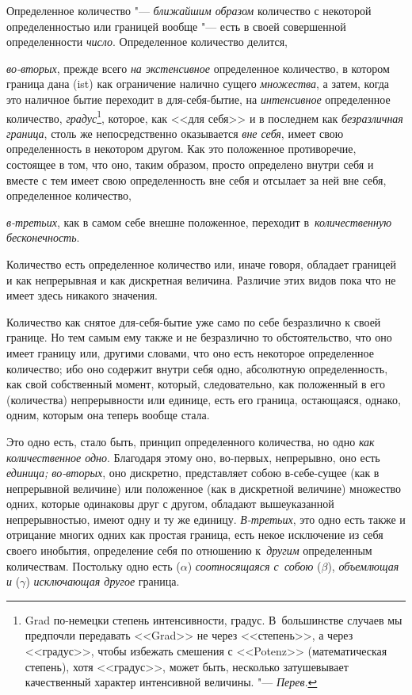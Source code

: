 Определенное количество "--- {\em ближайшим образом} количество с некоторой
определенностью или границей вообще "--- есть в своей совершенной
определенности {\em число}. Определенное количество делится,

{\em во-вторых}, прежде всего {\em на экстенсивное} определенное количество,
в котором граница дана (ist) как ограничение налично сущего {\em множества},
а затем, когда это наличное бытие переходит в для-себя-бытие, на
{\em интенсивное} определенное количество, {\em градус}\footnote{Grad
по-немецки степень интенсивности, градус. В~большинстве случаев мы предпочли
передавать <<Grad>> не через <<степень>>, а через <<градус>>, чтобы избежать
смешения с <<Potenz>> (математическая степень), хотя <<градус>>, может быть,
несколько затушевывает качественный характер интенсивной величины. "---
{\em Перев}.}, которое, как <<для себя>> и в последнем как {\em безразличная
граница}, столь же непосредственно оказывается {\em вне себя}, имеет свою
определенность в некотором другом. Как это положенное противоречие, состоящее
в том, что оно, таким образом, просто определено внутри себя и вместе с тем
имеет свою определенность вне себя и отсылает за ней вне себя, определенное
количество,

{\em в-третьих}, как в самом себе внешне положенное, переходит
в~{\em количественную бесконечность}.


Количество есть определенное количество или, иначе говоря, обладает границей
и как непрерывная и как дискретная величина. Различие этих видов пока что
не имеет здесь никакого значения.

Количество как снятое для-себя-бытие уже само по себе безразлично к своей
границе. Но тем самым ему также и не безразлично то обстоятельство, что оно
имеет границу или, другими словами, что оно есть некоторое определенное
количество; ибо оно содержит внутри себя одно, абсолютную определенность,
как свой собственный момент, который, следовательно, как положенный в его
(количества) непрерывности или единице, есть его граница, остающаяся,
однако, одним, которым она теперь вообще стала.

Это одно есть, стало быть, принцип определенного количества, но одно
{\em как количественное одно}. Благодаря этому оно, во-первых, непрерывно,
оно есть {\em единица; во-вторых}, оно дискретно, представляет собою
в-себе-сущее (как в непрерывной величине) или положенное (как в дискретной
величине) множество одних, которые одинаковы друг с другом, обладают
вышеуказанной непрерывностью, имеют одну и ту же единицу. {\em В-третьих},
это одно есть также и отрицание многих одних как простая граница, есть некое
исключение из себя своего инобытия, определение себя по отношению
к~{\em другим} определенным количествам. Постольку одно есть ($\alpha$)
{\em соотносящаяся с~собою} ($\beta$), {\em объемлющая и} ($\gamma$)
{\em исключающая другое} граница.

